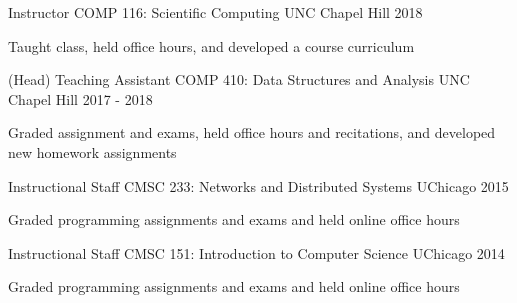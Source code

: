 
\begin{cventries}
  \cventry
    {Instructor} %
    {COMP 116: Scientific Computing} %
    {UNC Chapel Hill} %
    {2018} %
    {
      \begin{cvitems} %
        \item {Taught class, held office hours, and developed a course curriculum}
      \end{cvitems}
    }

  \cventry
    {(Head) Teaching Assistant} %
    {COMP 410: Data Structures and Analysis} %
    {UNC Chapel Hill} %
    {2017 - 2018} %
    {
      \begin{cvitems} %
        \item {Graded assignment and exams, held office hours and recitations, and developed new homework assignments}
      \end{cvitems}
    }

  \cventry
    {Instructional Staff} %
    {CMSC 233: Networks and Distributed Systems} %
    {UChicago} %
    {2015} %
    {
      \begin{cvitems} %
        \item {Graded programming assignments and exams and held online office hours}
      \end{cvitems}
    }
	
  \cventry
    {Instructional Staff} %
    {CMSC 151: Introduction to Computer Science} %
    {UChicago} %
    {2014} %
    {
      \begin{cvitems} %
        \item {Graded programming assignments and exams and held online office hours}
      \end{cvitems}
    }

\end{cventries}
